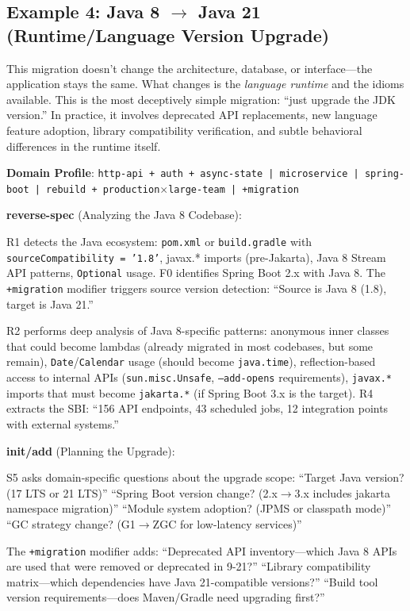 \documentclass[11pt,a4paper,openright,twoside]{report}
\begin{document}
\subsection{Example 4: Java 8 $\to$ Java 21 (Runtime/Language Version Upgrade)}

This migration doesn't change the architecture, database, or interface---the application stays the same. What changes is the \emph{language runtime} and the idioms available. This is the most deceptively simple migration: ``just upgrade the JDK version.'' In practice, it involves deprecated API replacements, new language feature adoption, library compatibility verification, and subtle behavioral differences in the runtime itself.

\textbf{Domain Profile}: \texttt{http-api + auth + async-state | microservice | spring-boot | rebuild + production$\times$large-team | +migration}

\textbf{reverse-spec} (Analyzing the Java 8 Codebase):

R1 detects the Java ecosystem: \texttt{pom.xml} or \texttt{build.gradle} with \texttt{sourceCompatibility = '1.8'}, javax.* imports (pre-Jakarta), Java 8 Stream API patterns, \texttt{Optional} usage. F0 identifies Spring Boot 2.x with Java 8. The \texttt{+migration} modifier triggers source version detection: ``Source is Java 8 (1.8), target is Java 21.''

R2 performs deep analysis of Java 8-specific patterns: anonymous inner classes that could become lambdas (already migrated in most codebases, but some remain), \texttt{Date}/\texttt{Calendar} usage (should become \texttt{java.time}), reflection-based access to internal APIs (\texttt{sun.misc.Unsafe}, \texttt{--add-opens} requirements), \texttt{javax.*} imports that must become \texttt{jakarta.*} (if Spring Boot 3.x is the target). R4 extracts the SBI: ``156 API endpoints, 43 scheduled jobs, 12 integration points with external systems.''

\textbf{init/add} (Planning the Upgrade):

S5 asks domain-specific questions about the upgrade scope: ``Target Java version? (17 LTS or 21 LTS)'' ``Spring Boot version change? (2.x$\to$3.x includes jakarta namespace migration)'' ``Module system adoption? (JPMS or classpath mode)'' ``GC strategy change? (G1$\to$ZGC for low-latency services)''

The \texttt{+migration} modifier adds: ``Deprecated API inventory---which Java 8 APIs are used that were removed or deprecated in 9-21?'' ``Library compatibility matrix---which dependencies have Java 21-compatible versions?'' ``Build tool version requirements---does Maven/Gradle need upgrading first?''
\end{document}
